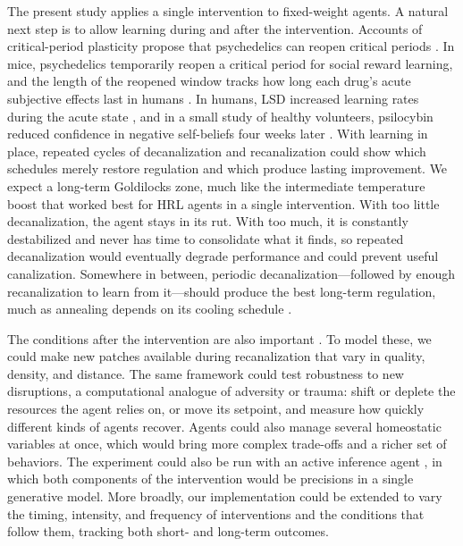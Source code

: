 \documentclass[12pt,fleqn]{article}
\begin{document}
The present study applies a single intervention to fixed-weight agents. A natural next step is to allow learning during and after the intervention. Accounts of critical-period plasticity propose that psychedelics can reopen critical periods \citep{dolen_emerging_2026}. In mice, psychedelics temporarily reopen a critical period for social reward learning, and the length of the reopened window tracks how long each drug's acute subjective effects last in humans \citep{nardou_psychedelics_2023}. In humans, LSD increased learning rates during the acute state \citep{kanen_effect_2023}, and in a small study of healthy volunteers, psilocybin reduced confidence in negative self-beliefs four weeks later \citep{zeifman_rebus_2025}. With learning in place, repeated cycles of decanalization and recanalization could show which schedules merely restore regulation and which produce lasting improvement. We expect a long-term Goldilocks zone, much like the intermediate temperature boost that worked best for HRL agents in a single intervention. With too little decanalization, the agent stays in its rut. With too much, it is constantly destabilized and never has time to consolidate what it finds, so repeated decanalization would eventually degrade performance and could prevent useful canalization. Somewhere in between, periodic decanalization---followed by enough recanalization to learn from it---should produce the best long-term regulation, much as annealing depends on its cooling schedule \citep{kirkpatrick_optimization_1983, hajek_cooling_1988}. 

The conditions after the intervention are also important \citep{carhart-harris_context_2018, dolen_emerging_2026}. To model these, we could make new patches available during recanalization that vary in quality, density, and distance. The same framework could test robustness to new disruptions, a computational analogue of adversity or trauma: shift or deplete the resources the agent relies on, or move its setpoint, and measure how quickly different kinds of agents recover. Agents could also manage several homeostatic variables at once, which would bring more complex trade-offs and a richer set of behaviors. The experiment could also be run with an active inference agent \citep{pezzulo_active_2015}, in which both components of the intervention would be precisions in a single generative model. More broadly, our implementation could be extended to vary the timing, intensity, and frequency of interventions and the conditions that follow them, tracking both short- and long-term outcomes.
\end{document}
